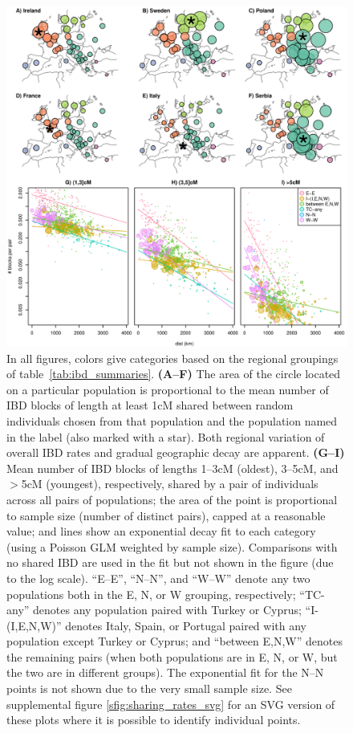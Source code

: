 \documentclass{article}
\begin{document}
\begin{figure}[!htp]
  \begin{center}
    \includegraphics{sharing-rates-and-maps}
    \caption{
    In all figures, colors give categories based on the regional groupings of table~\ref{tab:ibd_summaries}.
    {\bf (A--F)} The area of the circle located on a particular population
    is proportional to the mean number of IBD blocks of length at least 1cM shared 
    between random individuals chosen from that population and the population named in the label (also marked with a star).
    Both regional variation of overall IBD rates
    and gradual geographic decay are apparent.
    {\bf (G--I)} Mean number of IBD blocks of lengths 1--3cM (oldest), 3--5cM, and $>$5cM (youngest), 
    respectively, shared by a pair of individuals across all pairs of populations;
    the area of the point is proportional to sample size (number of distinct pairs), capped at a reasonable value;
    and lines show an exponential decay fit to each category (using a Poisson GLM weighted by sample size).
    Comparisons with no shared IBD are used in the fit but not shown in the figure (due to the log scale).
    ``E--E'', ``N--N'', and ``W--W'' denote any two populations both in the E, N, or W grouping, respectively;
    ``TC-any'' denotes any population paired with Turkey or Cyprus;
    ``I-(I,E,N,W)'' denotes Italy, Spain, or Portugal paired with any population except Turkey or Cyprus;
    and ``between E,N,W'' denotes the remaining pairs
    (when both populations are in E, N, or W, but the two are in different groups).
    The exponential fit for the N--N points is not shown due to the very small sample size.
    See supplemental figure \ref{sfig:sharing_rates_svg} for an SVG version of these plots where it is possible to identify individual points.
    \label{fig:sharing_and_maps}
    }
  \end{center}
\end{figure}
\end{document}

